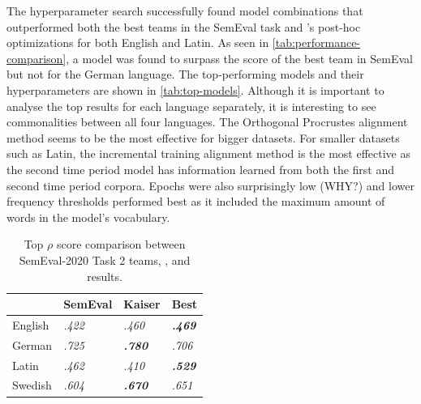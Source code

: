 The hyperparameter search successfully found model combinations that outperformed both the best teams in the SemEval task and \citet{kaiser-etal-2020-ims}’s post-hoc optimizations for both English and Latin. As seen in \autoref{tab:performance-comparison}, a model was found to surpass the score of the best team in SemEval but not \citet{kaiser-etal-2020-ims} for the German language. The top-performing models and their hyperparameters are shown in \autoref{tab:top-models}. Although it is important to analyse the top results for each language separately, it is interesting to see commonalities between all four languages. The Orthogonal Procrustes alignment method seems to be the most effective for bigger datasets. For smaller datasets such as Latin, the incremental training alignment method is the most effective as the second time period model has information learned from both the first and second time period corpora. Epochs were also surprisingly low (WHY?) and lower frequency thresholds performed best as it included the maximum amount of words in the model’s vocabulary. 

\begin{table}[h]
\centering
\begin{tabular}{|l|l|l|l|} 
\cline{2-4}
\multicolumn{1}{l|}{\textbf{ }} & SemEval         & Kaiser                   & Best                      \\ 
\hline
English                         & \textit{ .422 } & \textit{ .460 }          & \textbf{\textit{ .469 }}  \\ 
\hline
German                          & \textit{ .725 } & \textit{\textbf{ .780 }} & \textit{ .706 }           \\ 
\hline
Latin                           & \textit{ .462 } & \textit{ .410 }          & \textbf{\textit{ .529 }}  \\ 
\hline
Swedish                         & \textit{ .604 } & \textit{\textbf{ .670 }} & \textit{ .651 }           \\
\hline
\end{tabular}
\caption{Top $\rho$ score comparison between SemEval-2020 Task 2 teams, \citet{kaiser-etal-2020-ims}, and results.}
\label{tab:performance-comparison}
\end{table}


